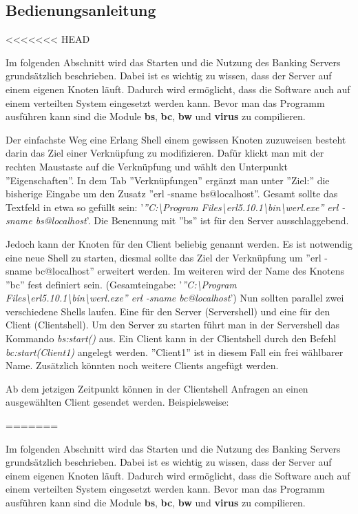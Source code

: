 \subsection{Bedienungsanleitung}
<<<<<<< HEAD

Im folgenden Abschnitt wird das Starten und die Nutzung des Banking Servers grundsätzlich beschrieben. Dabei ist es wichtig zu wissen, dass der Server auf einem eigenen Knoten läuft. Dadurch wird ermöglicht, dass die Software auch auf einem verteilten System eingesetzt werden kann. Bevor man das Programm ausführen kann sind die Module \textbf{bs}, \textbf{bc}, \textbf{bw} und \textbf{virus} zu compilieren.

Der einfachste Weg eine Erlang Shell einem gewissen Knoten zuzuweisen besteht darin das Ziel einer Verknüpfung zu modifizieren. Dafür klickt man mit der rechten Maustaste auf die Verknüpfung und wählt den Unterpunkt ''Eigenschaften''.  In dem Tab ''Verknüpfungen'' ergänzt man unter ''Ziel:'' die bisherige Eingabe um den Zusatz ''erl -sname bs@localhost''. Gesamt sollte das Textfeld in etwa so gefüllt sein: '\textit{''C:\textbackslash Program Files\textbackslash erl5.10.1\textbackslash bin\textbackslash werl.exe'' erl -sname bs@localhost}'. Die Benennung mit ''bs'' ist für den Server ausschlaggebend.

Jedoch kann der Knoten für den Client beliebig genannt werden. Es ist notwendig eine neue Shell zu starten, diesmal sollte das Ziel der Verknüpfung um ''erl -sname bc@localhost'' erweitert werden. Im weiteren wird der Name des Knotens ''bc'' fest definiert sein. (Gesamteingabe: '\textit{''C:\textbackslash Program Files\textbackslash erl5.10.1\textbackslash bin\textbackslash werl.exe'' erl -sname bc@localhost}') Nun sollten parallel zwei verschiedene Shells laufen. Eine für den Server (Servershell) und eine für den Client (Clientshell). Um den Server zu starten führt man in der Servershell das Kommando \textit{bs:start()} aus. Ein Client kann in der Clientshell durch den Befehl \textit{bc:start(Client1)} angelegt werden. ''Client1'' ist in diesem Fall ein frei wählbarer Name. Zusätzlich könnten noch weitere Clients angefügt werden.

Ab dem jetzigen Zeitpunkt können in der Clientshell Anfragen an einen ausgewählten Client gesendet werden. Beispielsweise:

=======

Im folgenden Abschnitt wird das Starten und die Nutzung des Banking Servers grundsätzlich beschrieben. Dabei ist es wichtig zu wissen, dass der Server auf einem eigenen Knoten läuft. Dadurch wird ermöglicht, dass die Software auch auf einem verteilten System eingesetzt werden kann. Bevor man das Programm ausführen kann sind die Module \textbf{bs}, \textbf{bc}, \textbf{bw} und \textbf{virus} zu compilieren.

